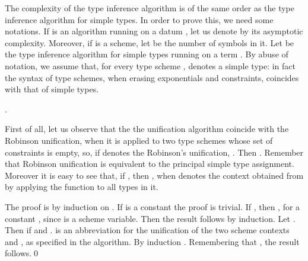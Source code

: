 \noindent The complexity of the type inference algorithm  is of
the same order as the type inference algorithm for simple types. In
order to prove this, we need some notations.  If  is an
algorithm running on a datum , let us denote by  its
asymptotic complexity.  Moreover, if  is a scheme, let
 be the number of symbols in it.  Let  be
the type inference algorithm for simple types running on a term
. By abuse of notation, we assume that, for every type scheme
,  denotes a simple type: in fact the
syntax of type schemes, when erasing exponentials and constraints,
coincides with that of simple types.
\begin{thm}[Complexity]
.
\end{thm}
\proof
First of all, let us observe that the the unification algorithm  coincide with the Robinson unification, when it is applied to two type schemes
whose set of constraints is empty, so, if  denotes the Robinson's unification, 
. 
Then 
.
Remember that Robinson unification is equivalent to the principal simple type assignment.
Moreover it is easy to see that, if , then 
, when  denotes the context obtained 
from  by applying the function  to all types in it.

The proof is by induction on . If  is a constant the proof is trivial.
If , then , for a constant , since  is a scheme variable. Then the result follows by induction.
Let . Then  
if  and 
  .  is an abbreviation for the unification of the 
  two scheme contexts  and , as specified in the algorithm. 
 By induction .
 Remembering that , the result follows.\qed
 






